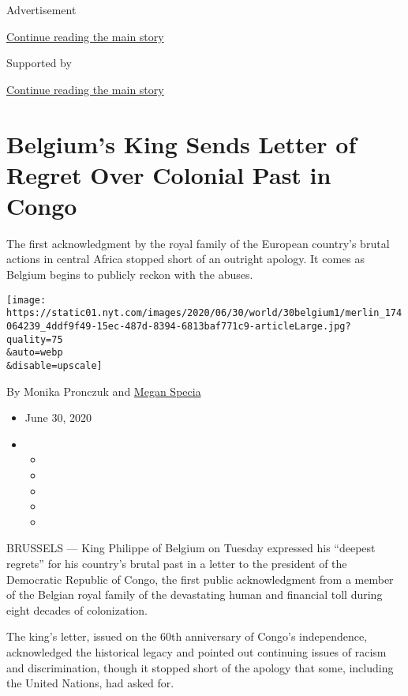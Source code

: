 Advertisement

\protect\hyperlink{after-top}{Continue reading the main story}

Supported by

\protect\hyperlink{after-sponsor}{Continue reading the main story}

\hypertarget{belgiums-king-sends-letter-of-regret-over-colonial-past-in-congo}{%
\section{Belgium's King Sends Letter of Regret Over Colonial Past in
Congo}\label{belgiums-king-sends-letter-of-regret-over-colonial-past-in-congo}}

The first acknowledgment by the royal family of the European country's
brutal actions in central Africa stopped short of an outright apology.
It comes as Belgium begins to publicly reckon with the abuses.

\texttt{[image: https://static01.nyt.com/images/2020/06/30/world/30belgium1/merlin\_174064239\_4ddf9f49-15ec-487d-8394-6813baf771c9-articleLarge.jpg?quality=75\\\&auto=webp\\\&disable=upscale]}

By Monika Pronczuk and
\href{https://www.nytimes.com/by/megan-specia}{Megan Specia}

\begin{itemize}
\item
  June 30, 2020
\item
  \begin{itemize}
  \item
  \item
  \item
  \item
  \item
  \end{itemize}
\end{itemize}

BRUSSELS --- King Philippe of Belgium on Tuesday expressed his ``deepest
regrets'' for his country's brutal past in a letter to the president of
the Democratic Republic of Congo, the first public acknowledgment from a
member of the Belgian royal family of the devastating human and
financial toll during eight decades of colonization.

The king's letter, issued on the 60th anniversary of Congo's
independence, acknowledged the historical legacy and pointed out
continuing issues of racism and discrimination, though it stopped short
of the apology that some, including the United Nations, had asked for.

